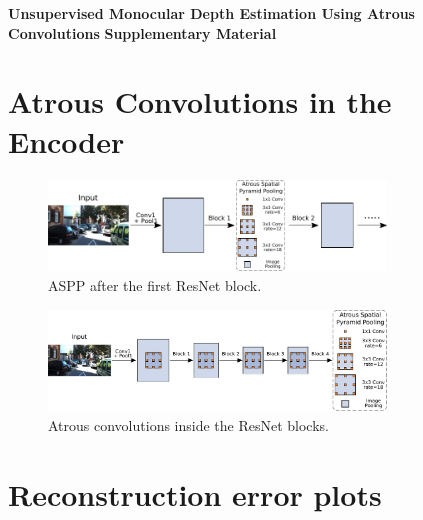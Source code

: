 \appendix
\onecolumn
\begin{center}
\textbf{\Large Unsupervised Monocular Depth Estimation Using Atrous Convolutions}
\textbf{\large Supplementary Material}
\end{center}

\setcounter{figure}{0}
\renewcommand\thefigure{\thesection.\arabic{figure}}
\setcounter{table}{0}
\renewcommand{\thetable}{\thesection.\arabic{table}}

\section{Atrous Convolutions in the Encoder}\label{appendix:atrous-encoder}
\setcounter{figure}{0}  
    
    \begin{figure}[ht]
    \centering
    \includegraphics[width=0.8\textwidth]{images/architecture/aspp-in-encoder.pdf}
    \caption{ASPP after the first ResNet block.}
    \label{fig:appendix:aspp-encoder}
    \end{figure}
    \begin{figure}[ht]
    \centering
    \includegraphics[width=0.8\textwidth]{images/architecture/encoder-with-atrous-rates.pdf}
    \caption{Atrous convolutions inside the ResNet blocks.}
    \label{fig:appendix:resnet-atrous}
    \end{figure}
    
     
\section{Reconstruction error plots}
\setcounter{figure}{0}    

